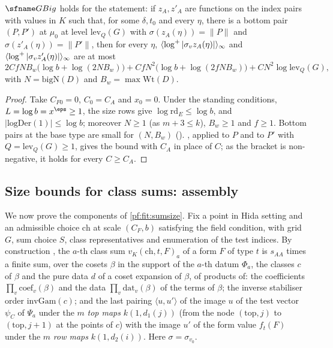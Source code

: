 \begin{theorem}\label{pf:fit:archgrid}
$\fitGBig$ holds for the statement: if $z_A,z'_A$ are functions on the index pairs with values in $K$ such that, for some
$\delta,t_0$ and every $\eta$, there is a bottom pair $(P,P')$ at $\mu_0$ at level $\mathrm{lev}_Q(G)$ with
$\sigma(z_A(\eta))=\|P\|$ and $\sigma(z'_A(\eta))=\|P'\|$, then for every $\eta$, $\langle \log^+|\sigma_vz_A(\eta)|\rangle_{\infty}$ and
$\langle \log^+|\sigma_vz'_A(\eta)|\rangle_{\infty}$ are at most
\[
2CfNB_w\bigl(\log b+\log(2NB_w)\bigr)+CfN^2\bigl(\log b+\log(2fNB_w)\bigr)+CN^2\log\mathrm{lev}_Q(G),
\]
with $N=\mathrm{bigN}(D)$ and $B_w=\max\mathrm{Wt}(D)$.
\end{theorem}

\begin{proof}
Take $C_{F0}=0$, $C_0=C_A$ and $x_0=0$. Under the standing conditions, $L=\log b=x^\eps\ge1$, the size rows give
$\log\mathrm{rd}_E\le\log b$, and $|\mathrm{logDer}(1)|\le\log b$; moreover $N\ge1$ (as $m+3\le k$), $B_w\ge1$ and $f\ge1$.
Bottom pairs at the base type are small for $(N,B_w)$ ().
, applied to $P$ and to $P'$ with $Q=\mathrm{lev}_Q(G)\ge1$, gives the bound with $C_A$ in place of $C$; as
the bracket is non-negative, it holds for every $C\ge C_A$.
\end{proof}

\subsection{Size bounds for class sums: assembly}\label{sec:pf:fit:sizes}

We now prove the components of \cref{pf:fit:sumsize}. Fix a point in Hida setting and an admissible choice $\mathrm{ch}$ at
scale $(C_F,b)$ satisfying the field condition, with grid $G$, sum choice $S$, class representatives and enumeration of the
test indices. By construction \cite{LeanSource2026}, the $a$-th class sum $v_K(\mathrm{ch},t,F)_a$ of a form $F$ of type $t$ is
$s_{AA}$ times a finite sum, over the cosets $\beta$ in the support of the $a$-th datum $\Phi_a$, the classes $c$ of $\beta$ and
the pure data $d$ of a coset expansion of $\beta$, of products of: the coefficients $\prod_v\mathrm{coef}_v(\beta)$ and the data
$\prod_v\mathrm{dat}_v(\beta)$ of the terms of $\beta$; the inverse stabiliser order $\mathrm{invGam}(c)$; and the last pairing
$\langle u,u'\rangle$ of the image $u$ of the test vector $\psi_C$ of $\Psi_a$ under the $m$ \emph{top maps} $k(1,d_1(j))$ (from
the node $(\mathrm{top},j)$ to $(\mathrm{top},j+1)$ at the points of $c$) with the image $u'$ of the form value $f_t(F)$ under the
$m$ \emph{row maps} $k(1,d_2(i))$. Here $\sigma=\sigma_{v_0}$.


